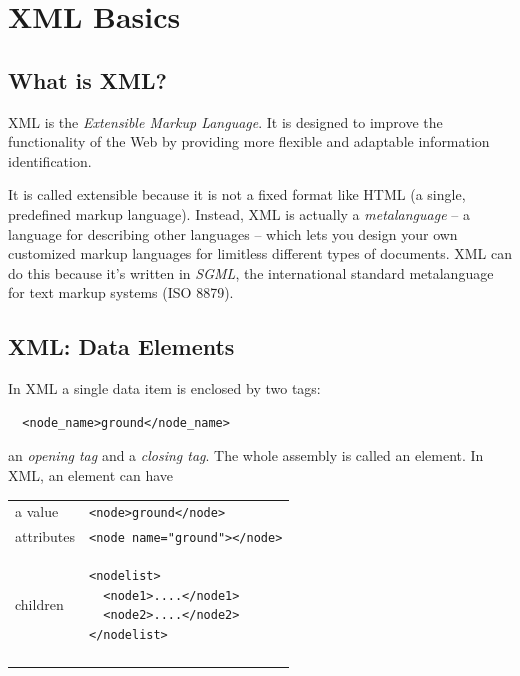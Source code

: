 \chapter{XML Basics}

\section{What is XML?}
XML is the \emph{Extensible Markup Language}. It is designed to
improve the functionality of the Web by providing more flexible and
adaptable information identification.

It is called extensible because it is not a fixed format like HTML (a single,
predefined markup language). Instead, XML is actually a \emph{metalanguage}
-- a language for describing other languages -- which lets you
design your own customized markup languages for limitless different
types of documents. XML can do this because it's written in \emph{SGML}, the
international standard metalanguage for text markup systems (ISO 8879).



\section{XML: Data Elements}
In XML a single data item is enclosed by two tags:
\begin{verbatim}
  <node_name>ground</node_name>
\end{verbatim}
an \emph{opening tag} and a \emph{closing tag}. The whole assembly is called an element.
In XML, an element can have

\begin{center}
  \begin{tabular}{ll}
    \hline\noalign{\smallskip}
    a value    & \verb!<node>ground</node>!\\
    \noalign{\smallskip}\hline\noalign{\smallskip} 
    attributes & \verb!<node name="ground"></node>!\\
    \noalign{\smallskip}\hline\noalign{\smallskip}
    children &  
    \begin{minipage}{10cm}
\begin{verbatim}
<nodelist>
  <node1>....</node1>
  <node2>....</node2>
</nodelist>
\end{verbatim}
    \end{minipage}\\
    \noalign{\smallskip}\hline
  \end{tabular}
\end{center}


